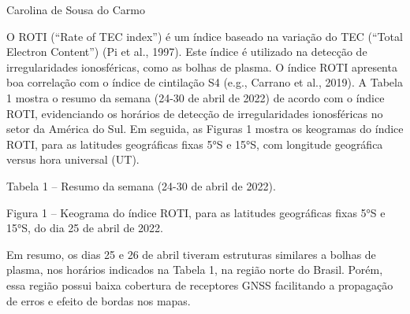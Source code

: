 \documentclass[11pt, oneside]{article}
\begin{document}
                     

Carolina de Sousa do Carmo



O ROTI (“Rate of TEC index”) é um índice baseado na variação do TEC (“Total Electron Content”) (Pi et al., 1997). Este índice é utilizado na detecção de irregularidades ionosféricas, como as bolhas de plasma. O índice ROTI apresenta boa correlação com o índice de cintilação S4 (e.g., Carrano et al., 2019). A Tabela 1 mostra o resumo da semana (24-30 de abril de 2022) de acordo com o índice ROTI, evidenciando os horários de detecção de irregularidades ionosféricas no setor da América do Sul. Em seguida, as Figuras 1 mostra os keogramas do índice ROTI, para as latitudes geográficas fixas 5°S e 15°S, com longitude geográfica versus hora universal (UT).



Tabela 1 – Resumo da semana (24-30 de abril de 2022).



Figura 1 – Keograma do índice ROTI, para as latitudes geográficas fixas 5°S e 15°S, do dia 25 de abril de 2022.



Em resumo, os dias 25 e 26 de abril tiveram estruturas similares a bolhas de plasma, nos horários indicados na Tabela 1, na região norte do Brasil. Porém, essa região possui baixa cobertura de receptores GNSS facilitando a propagação de erros e efeito de bordas nos mapas.
\end{document}
